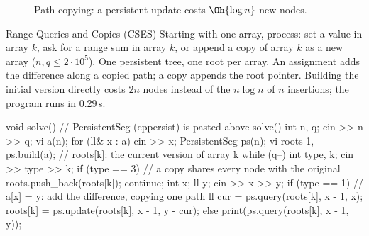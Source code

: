 \begin{figure}[htbp]
\centering
{}
\caption{Path copying: a persistent update costs $\Oh{\log n}$ new nodes.}
\label{fig:persistent}
\end{figure}

\begin{problem}{Range Queries and Copies (CSES)}
Starting with one array, process: set a value in array $k$, ask for a range sum in array $k$, or append a copy of array $k$ as a new
array ($n, q \le 2 \cdot 10^5$).
\solution One persistent tree, one root per array. An assignment adds the difference along a copied path; a copy appends the root
pointer. Building the initial version directly costs $2n$ nodes instead of the $n \log n$ of $n$ insertions; the program runs in
0.29\,s.
\end{problem}

\begin{code}
void solve() {  // PersistentSeg (cppersist) is pasted above solve()
    int n, q;
    cin >> n >> q;
    vi a(n);
    for (ll& x : a) cin >> x;
    PersistentSeg ps(n);
    vi roots{-1, ps.build(a)};  // roots[k]: the current version of array k
    while (q--) {
        int type, k;
        cin >> type >> k;
        if (type == 3) {  // a copy shares every node with the original
            roots.push_back(roots[k]);
            continue;
        }
        int x;
        ll y;
        cin >> x >> y;
        if (type == 1) {  // a[x] = y: add the difference, copying one path
            ll cur = ps.query(roots[k], x - 1, x);
            roots[k] = ps.update(roots[k], x - 1, y - cur);
        } else print(ps.query(roots[k], x - 1, y));
    }
}
\end{code}

